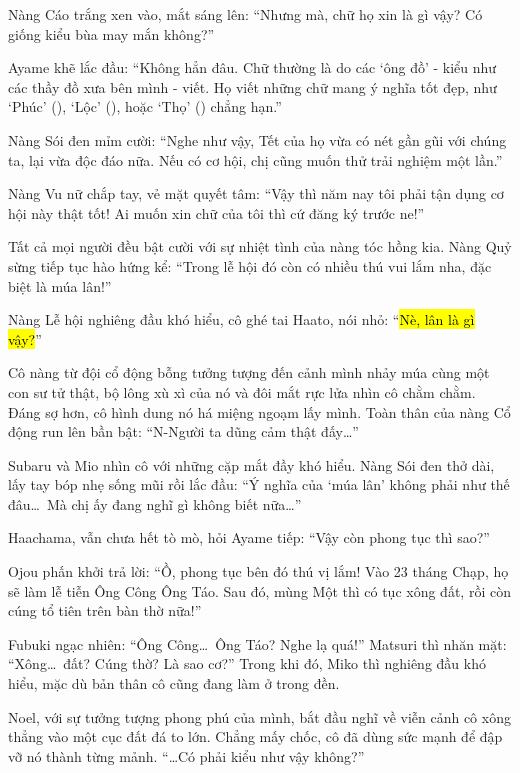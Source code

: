 \documentclass[../main.tex]{subfiles}
\begin{document}
Nàng Cáo trắng xen vào, mắt sáng lên: ``Nhưng mà, chữ họ xin là gì vậy? Có giống kiểu bùa may mắn không?''

Ayame khẽ lắc đầu: ``Không hẳn đâu. Chữ thường là do các `ông đồ' - kiểu như các thầy đồ xưa bên mình - viết. Họ viết những chữ mang ý nghĩa tốt đẹp, như `Phúc' (), `Lộc' (), hoặc `Thọ' () chẳng hạn.''

Nàng Sói đen mỉm cười: ``Nghe như vậy, Tết của họ vừa có nét gần gũi với chúng ta, lại vừa độc đáo nữa. Nếu có cơ hội, chị cũng muốn thử trải nghiệm một lần.''

Nàng Vu nữ chắp tay, vẻ mặt quyết tâm: ``Vậy thì năm nay tôi phải tận dụng cơ hội này thật tốt! Ai muốn xin chữ của tôi thì cứ đăng ký trước ne!''

Tất cả mọi người đều bật cười với sự nhiệt tình của nàng tóc hồng kia. Nàng Quỷ sừng tiếp tục hào hứng kể: ``Trong lễ hội đó còn có nhiều thú vui lắm nha, đặc biệt là múa lân!''

Nàng Lễ hội nghiêng đầu khó hiểu, cô ghé tai Haato, nói nhỏ: ``\hl{Nè, lân là gì vậy?}''

Cô nàng từ đội cổ động bỗng tưởng tượng đến cảnh mình nhảy múa cùng một con sư tử thật, bộ lông xù xì của nó và đôi mắt rực lửa nhìn cô chằm chằm. Đáng sợ hơn, cô hình dung nó há miệng ngoạm lấy mình. Toàn thân của nàng Cổ động run lên bần bật: ``N-Người ta dũng cảm thật đấy\dots''

Subaru và Mio nhìn cô với những cặp mắt đầy khó hiểu. Nàng Sói đen thở dài, lấy tay bóp nhẹ sống mũi rồi lắc đầu: ``Ý nghĩa của `múa lân' không phải như thế đâu\dots\ Mà chị ấy đang nghĩ gì không biết nữa\dots''

Haachama, vẫn chưa hết tò mò, hỏi Ayame tiếp: ``Vậy còn phong tục thì sao?''

Ojou phấn khởi trả lời: ``Ồ, phong tục bên đó thú vị lắm! Vào 23 tháng Chạp, họ sẽ làm lễ tiễn Ông Công Ông Táo. Sau đó, mùng Một thì có tục xông đất, rồi còn cúng tổ tiên trên bàn thờ nữa!''

Fubuki ngạc nhiên: ``Ông Công\dots\ Ông Táo? Nghe lạ quá!'' Matsuri thì nhăn mặt: ``Xông\dots\ đất? Cúng thờ? Là sao cơ?'' Trong khi đó, Miko thì nghiêng đầu khó hiểu, mặc dù bản thân cô cũng đang làm ở trong đền.

Noel, với sự tưởng tượng phong phú của mình, bắt đầu nghĩ về viễn cảnh cô xông thẳng vào một cục đất đá to lớn. Chẳng mấy chốc, cô đã dùng sức mạnh để đập vỡ nó thành từng mảnh. ``\dots Có phải kiểu như vậy không?''
\end{document}
